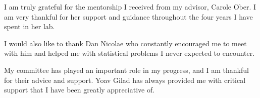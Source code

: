 \acknowledgments

I am truly grateful for the mentorship I received from my advisor, Carole Ober. I am very thankful for her support and guidance throughout the four years I have spent in her lab. 

I would also like to thank Dan Nicolae who constantly encouraged me to meet with him and helped me with statistical problems I never expected to encounter.

My committee has played an important role in my progress, and I am thankful for their advice and support. Yoav Gilad has always provided me with critical support that I have been greatly appreciative of. 